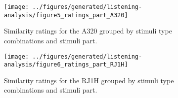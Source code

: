 %
%
%


%
\begin{figure}[H]
  \centering
  \texttt{[image: ../figures/generated/listening-analysis/figure5\_ratings\_part\_A320]}
  \caption{Similarity ratings for the A320 grouped by stimuli type combinations and stimuli part.}
  \label{fig:listening:results:ratings-A320-parts}

  \centering
  \texttt{[image: ../figures/generated/listening-analysis/figure6\_ratings\_part\_RJ1H]}
  \caption{Similarity ratings for the RJ1H grouped by stimuli type combinations and stimuli part.}
  \label{fig:listening:results:ratings-RJ1H-parts}
\end{figure}

\newpage
